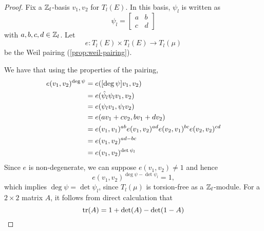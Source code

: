 \begin{proof}
	Fix a $\mathbb{Z}_l$-basis $v_1, v_2$ for $T_l(E)$. In this basis, $\psi_l$ is
	written as 
	\begin{equation*}
		\psi_l = 
		\begin{bmatrix}
			a & b\\
			c & d
		\end{bmatrix}
	\end{equation*}
	with $a, b, c, d \in \mathbb{Z}_l$.
	Let
	\begin{equation*}
		e: T_l(E) \times T_l(E) \to T_l(\mu)
	\end{equation*}
	be the Weil pairing (\ref{prop:weil-pairing}).

	We have that using the properties of the pairing,
	\begin{align*}
		e(v_1, v_2)^{\deg\psi} &= e([\deg \psi] v_1, v_2)\\
		&= e(\Hat\psi_l\psi_l v_1, v_2)\\
		&= e(\psi_l v_1, \psi_l v_2)\\
		&= e(av_1 + cv_2, bv_1 + dv_2)\\
		&= e(v_1, v_1)^{ab}e(v_1, v_2)^{ad}e(v_2, v_1)^{bc}e(v_2, v_2)^{cd}\\
		&= e(v_1, v_2)^{ad - bc}\\
		&= e(v_1, v_2)^{\det \psi_l}
	\end{align*}
	Since $e$ is non-degenerate, we can suppose $e(v_1, v_2) \neq 1$
	and hence
	\begin{equation*}
		e(v_1, v_2)^{\deg\psi - \det\psi_l} = 1,
	\end{equation*}
	which implies $\deg\psi = \det \psi_l$, since $T_l(\mu)$ is torsion-free
	as a $\mathbb{Z}_l$-module.
	For a $2\times 2$ matrix $A$, it follows from direct calculation that
	\begin{equation*}
		\operatorname{tr}(A) = 1 + \det(A) - \det(1-A)
	\end{equation*}
\end{proof}

